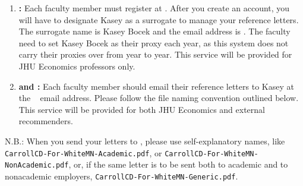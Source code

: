 \documentclass{econtex}
\begin{document}
\begin{enumerate}
\item {\bf \AEA:}
Each faculty member must register at \AEARecLink. After you create an account, you will have to designate Kasey as a surrogate to manage your reference letters. The surrogate name is Kasey Bocek and the email address is \JMStaffEmail. The faculty need to set Kasey Bocek as their proxy each year, as this system does not carry their proxies over from year to year. This service will be provided for JHU Economics professors only.

\item {\bf \AJO and \Interfolio:}
Each faculty member should email their reference letters to Kasey at the \JMStaffEmail~ email address. Please follow the file naming convention outlined below. This service will be provided for both JHU Economics and external recommenders.

\end{enumerate}

N.B.:  When you send your letters to \JMStaffEmail, please use self-explanatory names, like
\texttt{CarrollCD-For-WhiteMN-Academic.pdf}, or
\texttt{CarrollCD-For-WhiteMN-NonAcademic.pdf}, or, if the same letter
is to be sent both to academic and to nonacademic employers,
\texttt{CarrollCD-For-WhiteMN-Generic.pdf}.
\end{document}
